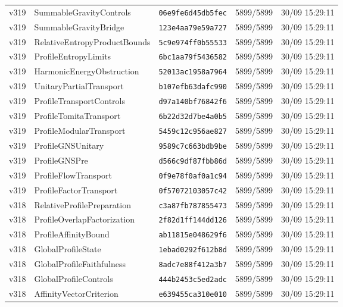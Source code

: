 \documentclass[11pt]{article}
\theoremstyle{definition}\newtheorem{deriv}{Derivação}
\begin{document}
{\begin{longtable}{@{}lllll@{}}
v319 & SummableGravityControls & \texttt{06e9fe6d45db5fec} & 5899/5899 & 30/09 15:29:11 \\
v319 & SummableGravityBridge & \texttt{123e4aa79e59a727} & 5899/5899 & 30/09 15:29:11 \\
v319 & RelativeEntropyProductBounds & \texttt{5c9e974ff0b55533} & 5899/5899 & 30/09 15:29:11 \\
v319 & ProfileEntropyLimits & \texttt{6bc1aa79f5436582} & 5899/5899 & 30/09 15:29:11 \\
v319 & HarmonicEnergyObstruction & \texttt{52013ac1958a7964} & 5899/5899 & 30/09 15:29:11 \\
v319 & UnitaryPartialTransport & \texttt{b107efb63dafc990} & 5899/5899 & 30/09 15:29:11 \\
v319 & ProfileTransportControls & \texttt{d97a140bf76842f6} & 5899/5899 & 30/09 15:29:11 \\
v319 & ProfileTomitaTransport & \texttt{6b22d32d7be4a0b5} & 5899/5899 & 30/09 15:29:11 \\
v319 & ProfileModularTransport & \texttt{5459c12c956ae827} & 5899/5899 & 30/09 15:29:11 \\
v319 & ProfileGNSUnitary & \texttt{9589c7c663bdb9be} & 5899/5899 & 30/09 15:29:11 \\
v319 & ProfileGNSPre & \texttt{d566c9df87fbb86d} & 5899/5899 & 30/09 15:29:11 \\
v319 & ProfileFlowTransport & \texttt{0f9e78f0af0a1c94} & 5899/5899 & 30/09 15:29:11 \\
v319 & ProfileFactorTransport & \texttt{0f57072103057c42} & 5899/5899 & 30/09 15:29:11 \\
v318 & RelativeProfilePreparation & \texttt{c3a87fb787855473} & 5899/5899 & 30/09 15:29:11 \\
v318 & ProfileOverlapFactorization & \texttt{2f82d1ff144dd126} & 5899/5899 & 30/09 15:29:11 \\
v318 & ProfileAffinityBound & \texttt{ab11815e048629f6} & 5899/5899 & 30/09 15:29:11 \\
v318 & GlobalProfileState & \texttt{1ebad0292f612b8d} & 5899/5899 & 30/09 15:29:11 \\
v318 & GlobalProfileFaithfulness & \texttt{8adc7e88f412a3b7} & 5899/5899 & 30/09 15:29:11 \\
v318 & GlobalProfileControls & \texttt{444b2453c5ed2adc} & 5899/5899 & 30/09 15:29:11 \\
v318 & AffinityVectorCriterion & \texttt{e639455ca310e010} & 5899/5899 & 30/09 15:29:11 \\

\end{longtable}}
\end{document}
